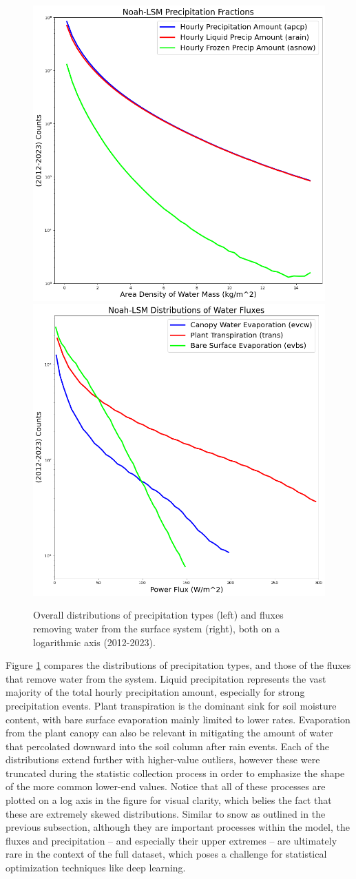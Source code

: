 \begin{figure}[h!]
    \centering
    \includegraphics[width=.48\linewidth]{figures/thesis-gridstats/gridstat-hist_groupings_preciptype.png}
    \includegraphics[width=.48\linewidth]{figures/thesis-gridstats/gridstat-hist_groupings_powerflux.png}
    \caption{Overall distributions of precipitation types (left) and fluxes removing water from the surface system (right), both on a logarithmic axis (2012-2023).}
    \label{dist-waterflux}
\end{figure}

Figure \ref{dist-waterflux} compares the distributions of precipitation types, and those of the fluxes that remove water from the system. Liquid precipitation represents the vast majority of the total hourly precipitation amount, especially for strong precipitation events. Plant transpiration is the dominant sink for soil moisture content, with bare surface evaporation mainly limited to lower rates. Evaporation from the plant canopy can also be relevant in mitigating the amount of water that percolated downward into the soil column after rain events. Each of the distributions extend further with higher-value outliers, however these were truncated during the statistic collection process in order to emphasize the shape of the more common lower-end values. Notice that all of these processes are plotted on a log axis in the figure for visual clarity, which belies the fact that these are extremely skewed distributions. Similar to snow as outlined in the previous subsection, although they are important processes within the model, the fluxes and precipitation -- and especially their upper extremes -- are ultimately rare in the context of the full dataset, which poses a challenge for statistical optimization techniques like deep learning.


